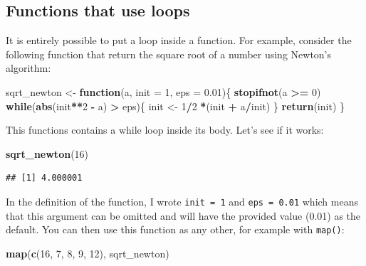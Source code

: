 \documentclass[]{gitbook}
\newenvironment{Shaded}{\begin{snugshade}}{\end{snugshade}}
\newcommand{\ControlFlowTok}[1]{\textcolor[rgb]{0.13,0.29,0.53}{\textbf{#1}}}
\newcommand{\DataTypeTok}[1]{\textcolor[rgb]{0.13,0.29,0.53}{#1}}
\newcommand{\DecValTok}[1]{\textcolor[rgb]{0.00,0.00,0.81}{#1}}
\newcommand{\FloatTok}[1]{\textcolor[rgb]{0.00,0.00,0.81}{#1}}
\newcommand{\KeywordTok}[1]{\textcolor[rgb]{0.13,0.29,0.53}{\textbf{#1}}}
\newcommand{\NormalTok}[1]{#1}
\newcommand{\OperatorTok}[1]{\textcolor[rgb]{0.81,0.36,0.00}{\textbf{#1}}}
\newcommand{\StringTok}[1]{\textcolor[rgb]{0.31,0.60,0.02}{#1}}
\theoremstyle{definition}
\theoremstyle{definition}
\theoremstyle{definition}
\theoremstyle{remark}
\begin{document}
\hypertarget{functions-that-use-loops}{%
\subsection{Functions that use loops}\label{functions-that-use-loops}}

It is entirely possible to put a loop inside a function. For example,
consider the following function that return the square root of a number
using Newton's algorithm:

\begin{Shaded}
\begin{Highlighting}[]
\NormalTok{sqrt_newton <-}\StringTok{ }\ControlFlowTok{function}\NormalTok{(a, }\DataTypeTok{init =} \DecValTok{1}\NormalTok{, }\DataTypeTok{eps =} \FloatTok{0.01}\NormalTok{)\{}
    \KeywordTok{stopifnot}\NormalTok{(a }\OperatorTok{>=}\StringTok{ }\DecValTok{0}\NormalTok{)}
    \ControlFlowTok{while}\NormalTok{(}\KeywordTok{abs}\NormalTok{(init}\OperatorTok{**}\DecValTok{2} \OperatorTok{-}\StringTok{ }\NormalTok{a) }\OperatorTok{>}\StringTok{ }\NormalTok{eps)\{}
\NormalTok{        init <-}\StringTok{ }\DecValTok{1}\OperatorTok{/}\DecValTok{2} \OperatorTok{*}\NormalTok{(init }\OperatorTok{+}\StringTok{ }\NormalTok{a}\OperatorTok{/}\NormalTok{init)}
\NormalTok{    \}}
    \KeywordTok{return}\NormalTok{(init)}
\NormalTok{\}}
\end{Highlighting}
\end{Shaded}

This functions contains a while loop inside its body. Let's see if it
works:

\begin{Shaded}
\begin{Highlighting}[]
\KeywordTok{sqrt_newton}\NormalTok{(}\DecValTok{16}\NormalTok{)}
\end{Highlighting}
\end{Shaded}

\begin{verbatim}
## [1] 4.000001
\end{verbatim}

In the definition of the function, I wrote \texttt{init\ =\ 1} and
\texttt{eps\ =\ 0.01} which means that this argument can be omitted and
will have the provided value (0.01) as the default. You can then use
this function as any other, for example with \texttt{map()}:

\begin{Shaded}
\begin{Highlighting}[]
\KeywordTok{map}\NormalTok{(}\KeywordTok{c}\NormalTok{(}\DecValTok{16}\NormalTok{, }\DecValTok{7}\NormalTok{, }\DecValTok{8}\NormalTok{, }\DecValTok{9}\NormalTok{, }\DecValTok{12}\NormalTok{), sqrt_newton)}
\end{Highlighting}
\end{Shaded}
\end{document}
